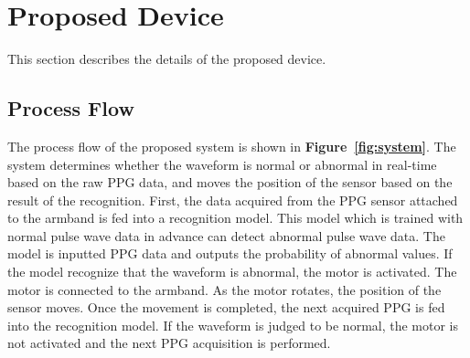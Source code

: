 \documentclass[sigconf]{acmart}
\newcommand\figref[1]{\textbf{Figure~\ref{fig:#1}}}
\begin{document}



\section{Proposed Device}
\label{sec:device}
This section describes the details of the proposed device.

\subsection{Process Flow}
The process flow of the proposed system is shown in \figref{system}. The system determines whether the waveform is normal or abnormal in real-time based on the raw PPG data, and moves the position of the sensor based on the result of the recognition. First, the data acquired from the PPG sensor attached to the armband is fed into a recognition model. This model which is trained with normal pulse wave data in advance can detect abnormal pulse wave data. The model is inputted PPG data and outputs the probability of abnormal values. If the model recognize that the waveform is abnormal, the motor is activated. The motor is connected to the armband. As the motor rotates, the position of the sensor moves. Once the movement is completed, the next acquired PPG is fed into the recognition model. If the waveform is judged to be normal, the motor is not activated and the next PPG acquisition is performed.
\end{document}
